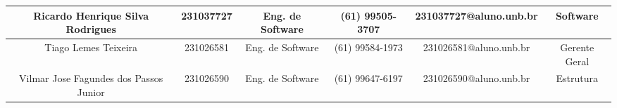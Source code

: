 \begin{landscape}
\begin{table}[htpb]
\begin{center}
\begin{tabular}{|c|c|c|c|c|c|}
Ricardo Henrique Silva Rodrigues & 231037727 & Eng. de Software & (61) 99505-3707 & 231037727@aluno.unb.br & Software \\ \hline
Tiago Lemes Teixeira & 231026581 & Eng. de Software & (61) 99584-1973 & 231026581@aluno.unb.br & Gerente Geral \\ \hline
Vilmar Jose Fagundes dos Passos Junior & 231026590 & Eng. de Software & (61) 99647-6197 & 231026590@aluno.unb.br & Estrutura \\ \hline
\end{tabular}
\end{center}
\end{table}

%

\end{landscape}
